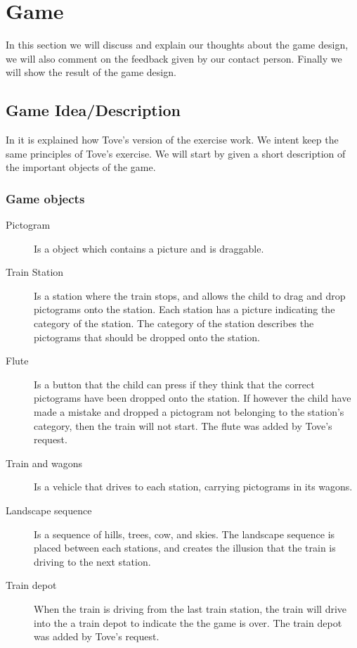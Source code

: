 \section{Game}
In this section we will discuss and explain our thoughts about the game design, we will also comment on the feedback given by our contact person. Finally we will show the result of the game design.

\subsection{Game Idea/Description}\label{sec:gameidea}
In  it is explained how Tove's version of the exercise work. We intent keep the same principles of Tove's exercise. We will start by given a short description of the important objects of the game.
\subsubsection*{Game objects}
\begin{description}
\item[Pictogram] Is a object which contains a picture and is draggable.
\item[Train Station] Is a station where the train stops, and allows the child to drag and drop pictograms onto the station. Each station has a picture indicating the category of the station. The category of the station describes the pictograms that should be dropped onto the station.  

\item[Flute] Is a button that the child can press if they think that the correct pictograms have been dropped onto the station. If however the child have made a mistake and dropped a pictogram not belonging to the station's category, then the train will not start. The flute was added by Tove's request.

\item[Train and wagons] Is a vehicle that drives to each station, carrying pictograms in its wagons.

\item[Landscape sequence] Is a sequence of hills, trees, cow, and skies. The landscape sequence is placed between each stations, and creates the illusion that the train is driving to the next station.

\item[Train depot] When the train is driving from the last train station, the train will drive into the a train depot to indicate the the game is over. The train depot was added by Tove's request.
\end{description}

